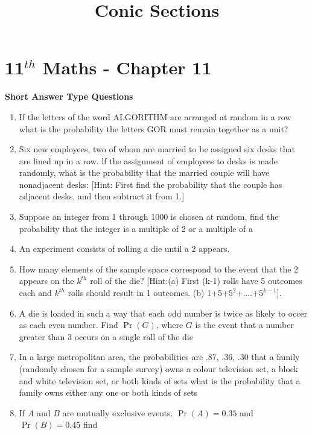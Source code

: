 \documentclass[12pt]{article}
\providecommand{\pr}[1]{\ensuremath{\Pr\left(#1\right)}}
\begin{document}
\begin{center}
\enlargethispage{-4cm}
\title{\textbf{Conic Sections}}
\date{\vspace{-5ex}} %
\maketitle
\end{center}
\setcounter{page}{1}
\section*{11$^{th}$ Maths - Chapter 11}
\textbf{Short Answer Type Questions}
\begin{enumerate}
\item If the letters of the word ALGORITHM are arranged at random in a row what is the probability the letters GOR must remain together as a unit?
\item Six new employees, two of whom are married to be assigned six desks that are lined up in a row. lf the assignment of employees to desks is made randomly, what is the probability that the married couple will have nonadjacent desks:
[Hint: First find the probability that the couple has adjacent desks, and then subtract it from 1.]
\item Suppose an integer from 1 through 1000 is chosen at random, find the probability that the integer is a multiple of 2 or a multiple of a
\item An experiment consists of rolling a die until a 2 appears.
\item How many elements of the sample space correspond to the event that the 2 appears on the $k^{th}$ roll of the die?
	[Hint:(a) First (k-1) rolls have 5 outcomes each and $k^{th}$ rolls should result in 1 outcomes. (b) 1+5+$5^2$+....+$5^{k-1}$].
\item A die is loaded in such a way that each odd number is twice as likely to occer as each even number. Find $\pr{G}$, where $G$ is the event that a number greater than 3 occurs on a  single rall of the die
\item In a large metropolitan area, the probabilities are .87, .36, .30 that a family (randomly chosen for a sample survey) owns a colour television set, a block and white television set, or both kinds of sets what is the probability that a family owns either any one or both kinds of sets
\item  If $A$ and $B$ are mutually exclusive events. $\pr{A}=0.35$ and $\pr{B}=0.45$ find
\begin{enumerate}

\end{enumerate}
\end{enumerate}
\end{document}
